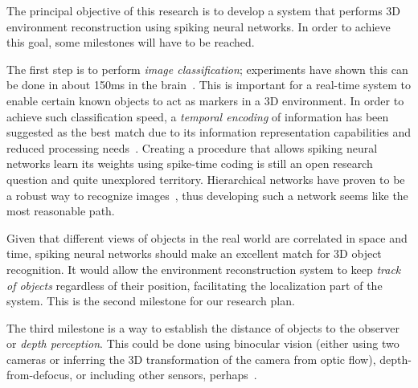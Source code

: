 The principal objective of this research is to develop a system that performs 3D environment reconstruction using spiking neural networks. In order to achieve this goal, some milestones will have to be reached. 

The first step is to perform \emph{image classification}; experiments have shown this can be done in about 150ms in the brain~\cite{Thorpe1996-speed-of-processing}. This is important for a real-time system to enable certain known objects to act as markers in a 3D environment. In order to achieve such classification speed, a \emph{temporal encoding} of information has been suggested as the best match due to its information representation capabilities and reduced processing needs~\cite{VanRullen2005-spike-times}. Creating a procedure that allows spiking neural networks learn its weights using spike-time coding is still an open research question and quite unexplored territory. Hierarchical networks have proven to be a robust way to recognize images~\cite{Behnke2003-hierachical-interpretation,Bengio2009-deep-architectures}, thus developing such a network seems like the most reasonable path. 

Given that different views of objects in the real world are correlated in space and time, spiking neural networks should make an excellent match for 3D object recognition. It would allow the environment reconstruction system to keep \emph{track of objects} regardless of their position, facilitating the localization part of the system. This is the second milestone for our research plan.

The third milestone is a way to establish the distance of objects to the observer or \emph{depth perception}. This could be done using binocular vision (either using two cameras or inferring the 3D transformation of the camera from optic flow), depth-from-defocus, or including other sensors, perhaps~\cite{depth-from-binocular-defocus-vs,event-slam,tomasi1992shape}. 

